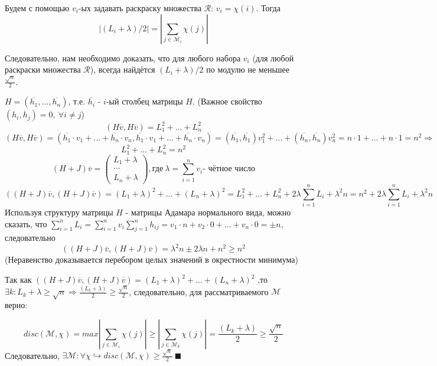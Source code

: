 Будем с помощью $v_i$-ых задавать раскраску множества $\mathcal{R}$: $v_i = \chi(i)$. Тогда 
$$|(L_i + \lambda) / 2| = |\sum_{j \in \mathcal{M}_i} \chi(j)|$$

Следовательно, нам необходимо доказать, что для любого набора $v_i$ (для любой раскраски множества $\mathcal{R}$), всегда найдётся $(L_i + \lambda) / 2$ по модулю не меньшее $\frac{\sqrt{n}}{2}$.

$H = (\overline{h_1}, \ldots, \overline{h_n})$, т.е. $\overline{h_i}$ - $i$-ый столбец матрицы $H$. (Важное свойство $(h_i, h_j) = 0, \ \forall i \neq j$)
$$
(H\overline{v}, H\overline{v}) = L_1^2 + \ldots + L_n^2
$$
$$
(H\overline{v}, H\overline{v}) = (\overline{h_1} \cdot v_1 + \ldots + \overline{h_n} \cdot v_n, \overline{h_1} \cdot v_1 + \ldots + \overline{h_n} \cdot v_n) = (\overline{h_1}, \overline{h_1}) v_1^2 + \ldots + (\overline{h_n}, \overline{h_n}) v_n^2 = n \cdot 1 + \ldots + n \cdot 1 = n^2 \Rightarrow
$$
$$
L_1^2 + \ldots + L_n^2 = n^2
$$
$$
(H + J) \overline{v} = 
\begin{pmatrix} 
L_1 + \lambda \\ 
\cdots \\
L_n + \lambda
\end{pmatrix}
,\text{где} \ \lambda = \sum_{i = 1}^n v_i 
\text{- чётное число}
$$
$$
((H + J)\overline{v}, (H + J)\overline{v}) = (L_1 + \lambda)^2 + 
\ldots + (L_n + \lambda)^2 = L_1^2 + \ldots + L_n^2 + 2 \lambda \sum_{i = 1}^n L_i + \lambda^2 n = n^2 + 2 \lambda \sum_{i = 1}^n L_i + \lambda^2 n
$$
Используя структуру матрицы $H$ - матрицы Адамара нормального вида, можно сказать, что $\sum_{i = 1}^n L_i = \sum_{i = 1}^n v_i \sum_{j = 1}^n h_{ij} = v_1 \cdot n + v_2 \cdot 0 + \ldots + v_n \cdot 0 = \pm n$, следовательно
$$
((H + J)\overline{v}, (H + J)\overline{v}) = \lambda^2 n \pm 2 \lambda n + n^2 \geq n^2
$$
(Неравенство доказывается перебором целых значений в окрестности минимума)

Так как $((H + J)\overline{v}, (H + J)\overline{v}) = (L_1 + \lambda)^2 + \ldots + (L_n + \lambda)^2$ ,то $\exists k: L_k + \lambda \geq \sqrt{n} \Rightarrow \frac{(L_k + \lambda)}{2} \geq \frac{\sqrt{n}}{2} $, следовательно, для рассматриваемого $\mathcal{M}$ верно:

$$disc(\mathcal{M}, \chi) = max|\sum_{j \in \mathcal{M}_i} \chi(j)|  \geq |\sum_{j \in \mathcal{M}_k} \chi(j)| = \frac{(L_k + \lambda)}{2} \geq \frac{\sqrt{n}}{2}$$
Следовательно, $\exists \mathcal{M}: \forall \chi \hookrightarrow disc(\mathcal{M}, \chi) \geq \frac{\sqrt{n}}{2}\ \blacksquare$